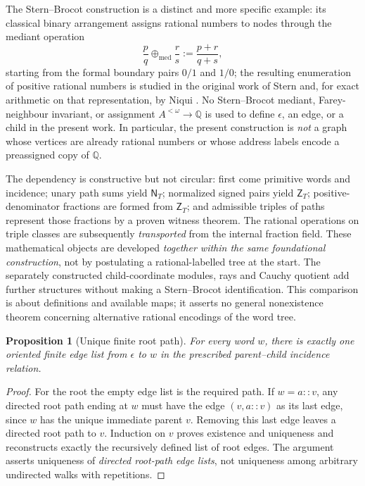 \documentclass[11pt,reqno]{amsart}
\newtheorem{proposition}[theorem]{Proposition}
\theoremstyle{definition}\newtheorem{definition}[theorem]{Definition}
\theoremstyle{remark}\newtheorem{remark}[theorem]{Remark}
\newcommand{\N}{\mathsf N_T}\newcommand{\Z}{\mathsf Z_T}\newcommand{\Q}{\mathsf Q_T}\newcommand{\RR}{\mathsf R}
\begin{document}
The Stern--Brocot construction is a distinct and more specific example:
its classical binary arrangement assigns rational numbers to nodes through
the mediant operation
\[
\frac{p}{q}\mathbin{\oplus_{\mathrm{med}}}\frac{r}{s}
   :=\frac{p+r}{q+s},
\]
starting from the formal boundary pairs $0/1$ and $1/0$; the resulting enumeration of
positive rational numbers is studied in the original work of Stern
\cite{stern1858} and, for exact arithmetic on that representation, by
Niqui \cite{niqui2007}. No Stern--Brocot mediant, Farey-neighbour
invariant, or assignment $A^{<\omega}\to\mathbb Q$ is used to define
$\epsilon$, an edge, or a child in the present work. In particular, the
present construction is \emph{not} a graph whose vertices are already
rational numbers or whose address labels encode a preassigned copy of
$\mathbb Q$.

The dependency is constructive but not circular: first come primitive
words and incidence; unary path sums yield $\N$; normalized signed
pairs yield $\Z$; positive-denominator fractions are formed from $\Z$;
and admissible triples of paths represent those fractions by a proven
witness theorem. The rational operations on triple classes are subsequently
\emph{transported} from the internal fraction field. These mathematical
objects are developed \emph{together within the same foundational
construction}, not by postulating a rational-labelled tree at the start.
The separately constructed child-coordinate modules, rays and Cauchy
quotient add further structures without making a Stern--Brocot
identification. This comparison is about definitions and available maps;
it asserts no general nonexistence theorem concerning alternative
rational encodings of the word tree.

\begin{proposition}[Unique finite root path]\label{prop:path}
For every word $w$, there is exactly one oriented finite edge list from $\epsilon$ to $w$ in the prescribed parent--child incidence relation.
\end{proposition}
\begin{proof}
For the root the empty edge list is the required path. If $w=a::v$, any directed root path ending at $w$ must have the edge $(v,a::v)$ as its last edge, since $w$ has the unique immediate parent $v$. Removing this last edge leaves a directed root path to $v$. Induction on $v$ proves existence and uniqueness and reconstructs exactly the recursively defined list of root edges. The argument asserts uniqueness of \emph{directed root-path edge lists}, not uniqueness among arbitrary undirected walks with repetitions.
\end{proof}
\end{document}
